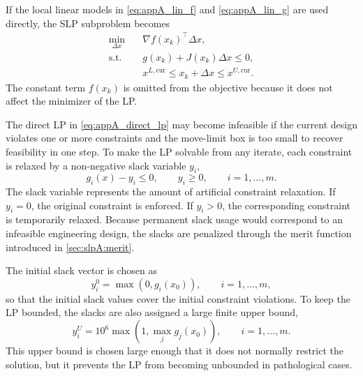 If the local linear models in \autoref{eq:appA_lin_f} and
\autoref{eq:appA_lin_g} are used directly, the SLP subproblem becomes
\begin{equation}
\label{eq:appA_direct_lp}
\begin{aligned}
    \min_{\Delta x}\quad
        & \nabla f(x_k)^{\!\top}\Delta x ,
    \\
    \text{s.t.}\quad
        & g(x_k) + J(x_k)\Delta x \leq 0 ,
    \\
        & x^{L,\mathrm{cur}}
          \leq
          x_k + \Delta x
          \leq
          x^{U,\mathrm{cur}} .
\end{aligned}
\end{equation}
The constant term $f(x_k)$ is omitted from the objective because it
does not affect the minimizer of the LP.

The direct LP in \autoref{eq:appA_direct_lp} may become infeasible if
the current design violates one or more constraints and the
move-limit box is too small to recover feasibility in one step. To
make the LP solvable from any iterate, each constraint is relaxed by
a non-negative slack variable $y_i$,
\begin{equation}
\label{eq:appA_slack}
    g_i(x) - y_i \leq 0,
    \qquad
    y_i \geq 0,
    \qquad
    i = 1,\dots,m .
\end{equation}
The slack variable represents the amount of artificial constraint
relaxation. If $y_i = 0$, the original constraint is enforced. If
$y_i > 0$, the corresponding constraint is temporarily relaxed.
Because permanent slack usage would correspond to an infeasible
engineering design, the slacks are penalized through the merit
function introduced in \autoref{sec:slpA:merit}.

The initial slack vector is chosen as
\begin{equation}
\label{eq:appA_slack_init}
    y_i^0 = \max\left(0, g_i(x_0)\right),
    \qquad i = 1,\dots,m ,
\end{equation}
so that the initial slack values cover the initial constraint
violations. To keep the LP bounded, the slacks are also assigned a
large finite upper bound,
\begin{equation}
\label{eq:appA_slack_upper}
    y_i^U =
    10^6 \max\left(1,\max_j g_j(x_0)\right),
    \qquad i = 1,\dots,m .
\end{equation}
This upper bound is chosen large enough that it does not normally
restrict the solution, but it prevents the LP from becoming
unbounded in pathological cases.

